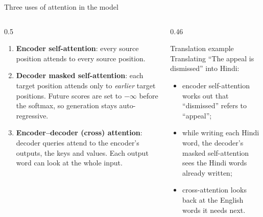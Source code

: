 \documentclass[aspectratio=169,11pt]{beamer}
\begin{document}
\begin{frame}{Three uses of attention in the model}
  \begin{columns}[T]
    \begin{column}{0.5\textwidth}
      \small
      \begin{enumerate}
        \item \textbf{Encoder self-attention}: every source position attends to every source position.
        \item \textbf{Decoder masked self-attention}: each target position attends only to \emph{earlier} target positions. Future scores are set to $-\infty$ before the softmax, so generation stays auto-regressive.
        \item \textbf{Encoder--decoder (cross) attention}: decoder queries attend to the encoder's outputs, the keys and values. Each output word can look at the whole input.
      \end{enumerate}
    \end{column}
    \begin{column}{0.46\textwidth}
      \begin{exampleblock}{Translation example}
        \small
        Translating ``The appeal is dismissed'' into Hindi:
        \begin{itemize}
          \item encoder self-attention works out that ``dismissed'' refers to ``appeal'';
          \item while writing each Hindi word, the decoder's masked self-attention sees the Hindi words already written;
          \item cross-attention looks back at the English words it needs next.
        \end{itemize}
      \end{exampleblock}
    \end{column}
  \end{columns}
\end{frame}
\end{document}

